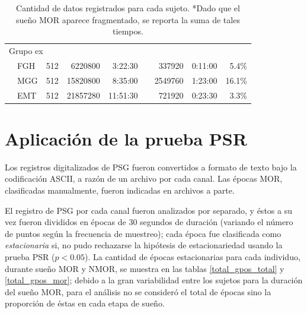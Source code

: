 \begin{table}
{\begin{tabular}{llcrrcrrr}
\multicolumn{6}{l}{{Grupo ex}}\\
&FGH &512       &6220800 &   3:22:30 &&337920  &   0:11:00 & 5.4\% \\
&MGG &512       &15820800&   8:35:00 &&2549760 &   1:23:00 &16.1\% \\
&EMT &512       &21857280&  11:51:30 &&721920  &   0:23:30 & 3.3\% \\
\bottomrule
\end{tabular}
}
\caption{Cantidad de datos registrados para cada sujeto. *Dado que el sueño MOR aparece fragmentado,
se reporta la suma de tales tiempos.}
\label{frecuencias}
\end{table}


\section{Aplicación de la prueba PSR}

Los registros digitalizados de PSG fueron convertidos a formato de texto bajo la codificación 
ASCII, a razón de un archivo por cada canal. 
Las épocas MOR, clasificadas manualmente, fueron indicadas en archivos a parte.



El registro de PSG por cada canal fueron analizados por separado, y éstos a su vez fueron divididos
en épocas de 30 segundos de duración (variando el número de puntos según la frecuencia de muestreo);
cada época fue clasificada como \textit{estacionaria} si, no pudo rechazarse la hipótesis de 
estacionariedad usando la prueba PSR ($p < 0.05$).
La cantidad de épocas estacionarias para cada individuo, durante sueño MOR y NMOR, se muestra en 
las tablas \ref{total_gpos_total} y \ref{total_gpos_mor}; debido a la gran variabilidad entre los 
sujetos para la duración del sueño MOR, para el análisis no se consideró el total de épocas sino la 
proporción de éstas en cada etapa de sueño. 

